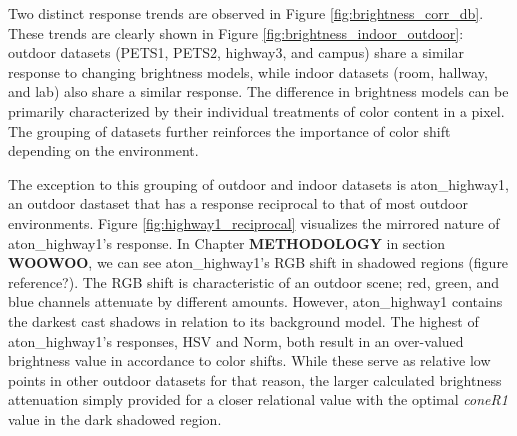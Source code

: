 \documentclass[12pt]{report}
\begin{document}
Two distinct response trends are observed in Figure \ref{fig:brightness_corr_db}. These trends are clearly shown in Figure \ref{fig:brightness_indoor_outdoor}: outdoor datasets (PETS1, PETS2, highway3, and campus) share a similar response to changing brightness models, while indoor datasets (room, hallway, and lab) also share a similar response. The difference in brightness models can be primarily characterized by their individual treatments of color content in a pixel. The grouping of datasets further reinforces the importance of color shift depending on the environment.

The exception to this grouping of outdoor and indoor datasets is aton\_highway1, an outdoor dastaset that has a response reciprocal to that of most outdoor environments. Figure \ref{fig:highway1_reciprocal} visualizes the mirrored nature of aton\_highway1's response. In Chapter \textbf{METHODOLOGY} in section \textbf{WOOWOO}, we can see aton\_highway1's RGB shift in shadowed regions (figure reference?). The RGB shift is characteristic of an outdoor scene; red, green, and blue channels attenuate by different amounts. However, aton\_highway1 contains the darkest cast shadows in relation to its background model. The highest of aton\_highway1's responses, HSV and Norm, both result in an over-valued brightness value in accordance to color shifts. While these serve as relative low points in other outdoor datasets for that reason, the larger calculated brightness attenuation simply provided for a closer relational value with the optimal \textit{coneR1} value in the dark shadowed region.
\end{document}
